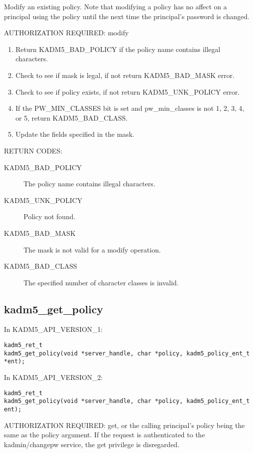 Modify an existing policy.  Note that modifying a policy has no affect
on a principal using the policy until the next time the principal's
password is changed.

AUTHORIZATION REQUIRED: modify

\begin{enumerate}
\item Return KADM5_BAD_POLICY if the policy name contains illegal
characters.
\item Check to see if mask is legal, if not return KADM5_BAD_MASK error.
\item Check to see if policy exists, if not return
KADM5_UNK_POLICY error.
\item If the PW_MIN_CLASSES bit is set and pw_min_classes is not 1, 2,
3, 4, or 5, return KADM5_BAD_CLASS.
\item Update the fields specified in the mask.
\end{enumerate}

RETURN CODES: 

\begin{description}
\item[KADM5_BAD_POLICY] The policy name contains illegal characters.
\item[KADM5_UNK_POLICY] Policy not found.
\item[KADM5_BAD_MASK] The mask is not valid for a modify
operation.
\item[KADM5_BAD_CLASS] The specified number of character classes
is invalid.
\end{description}

\subsection{kadm5_get_policy}

In KADM5_API_VERSION_1:

\begin{verbatim}
kadm5_ret_t
kadm5_get_policy(void *server_handle, char *policy, kadm5_policy_ent_t *ent); 
\end{verbatim}

In KADM5_API_VERSION_2:

\begin{verbatim}
kadm5_ret_t
kadm5_get_policy(void *server_handle, char *policy, kadm5_policy_ent_t ent); 
\end{verbatim}

AUTHORIZATION REQUIRED: get, or the calling principal's policy being
the same as the policy argument.  If the request is authenticated to
the kadmin/changepw service, the get privilege is disregarded.

